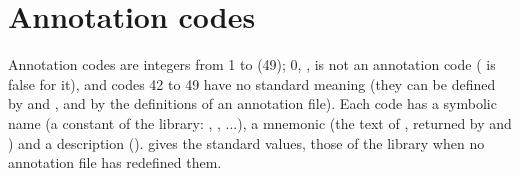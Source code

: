 \section{Annotation codes}
\label{sec:formats-codes}

Annotation codes are integers from 1 to  (49); 0, , is not an
annotation code ( is false for it), and codes 42 to 49 have no standard meaning
(they can be defined by  and , and by the definitions of
an annotation file). Each code has a symbolic name (a constant of the library: ,
, ...), a mnemonic (the text of , returned by  and
) and a description ().  gives the standard
values, those of the library when no annotation file has redefined them.

